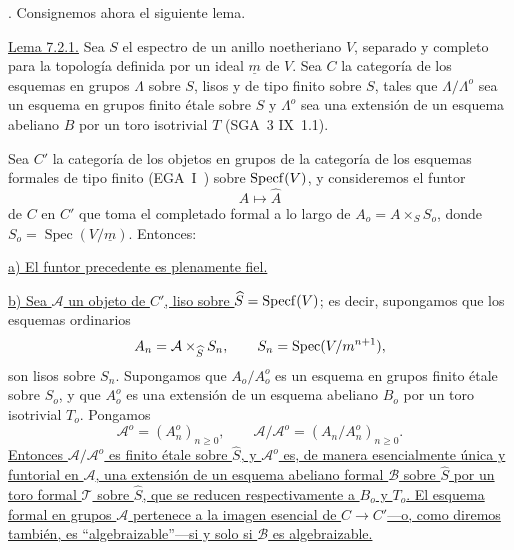 
\medskip
{}. Consignemos ahora el siguiente lema.

\medskip
\noindent
\underline{Lema 7.2.1.} Sea $S$ el espectro de un anillo noetheriano
$V$, separado y completo para la topología definida por un ideal
$\underline m$ de $V$. Sea $C$ la categoría de los esquemas en grupos
$\Lambda$ sobre $S$, lisos y de tipo finito sobre $S$, tales que
$\Lambda/\Lambda^o$ sea un esquema en grupos finito étale sobre $S$ y
$\Lambda^o$ sea una extensión de un esquema abeliano $B$ por un toro
isotrivial $T$ (SGA~3 IX~1.1).


Sea $C'$ la categoría de los objetos en grupos de la categoría de los
esquemas formales de tipo finito (EGA~I~) sobre
$\operatorname{Specf}(\sisi{A}{V})$, y consideremos el funtor
\[
 A\longmapsto\widehat A
\]
de $C$ en $C'$ que toma el completado formal a lo largo de
$A_o=A\times_S S_o$, donde
$S_o=\operatorname{Spec}(V/\underline m)$. Entonces:

\smallskip
\noindent
\underline{a) El funtor precedente es plenamente fiel.}

\smallskip
\noindent
\underline{b) Sea $\mathcal A$ un objeto de $C'$, liso sobre
$\widehat S=\operatorname{Specf}(\sisi{A}{V})$}; es decir, supongamos que
los esquemas ordinarios
\[
 A_n=\mathcal A\times_{\widehat S}S_n,
 \qquad
 S_n=\operatorname{Spec}(\sisi{A}{V}/\underline m^{n+1}),
\]
son lisos sobre $S_n$. Supongamos que $A_o/A_o^o$ es un esquema en
grupos finito étale sobre $S_o$, y que $A_o^o$ es una extensión de un
esquema abeliano $B_o$ por un toro isotrivial $T_o$. Pongamos
\[
 \mathcal A^o=(A_n^o)_{n\geq0},
 \qquad
 \mathcal A/\mathcal A^o=(A_n/A_n^o)_{n\geq0}.
\]
\underline{Entonces $\mathcal A/\mathcal A^o$ es finito étale sobre
$\widehat S$, y $\mathcal A^o$ es, de manera esencialmente única y
funtorial en $\mathcal A$, una extensión de un esquema abeliano formal
$\mathcal B$ sobre $\widehat S$ por un toro formal $\mathcal T$ sobre
$\widehat S$, que se reducen respectivamente a $B_o$ y $T_o$. El esquema
formal en grupos $\mathcal A$ pertenece a la imagen esencial de
$C\longrightarrow C'$---o, como diremos también, es
``algebraizable''---si y solo si $\mathcal B$ es algebraizable.}

